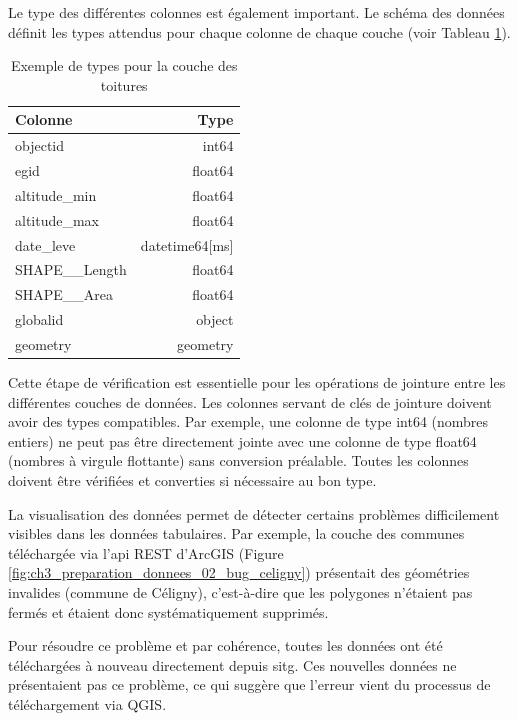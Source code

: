 Le type des différentes colonnes est également important. Le schéma des données définit les types attendus pour chaque colonne de chaque couche (voir Tableau \ref{tab:exemple_types_couche_toitures}).

\begin{table}[H]
    \centering
    \begin{tabular}{@{}lr@{}}
    \toprule
    \textbf{Colonne} & \textbf{Type} \\
    \midrule
    objectid & int64 \\
    egid & float64 \\
    altitude\_min & float64 \\
    altitude\_max & float64 \\
    date\_leve & datetime64[ms] \\
    SHAPE\_\_Length & float64 \\
    SHAPE\_\_Area & float64 \\
    globalid & object \\
    geometry & geometry \\
    \bottomrule
    \end{tabular}
    \caption{Exemple de types pour la couche des toitures}
    \label{tab:exemple_types_couche_toitures}
\end{table}

Cette étape de vérification est essentielle pour les opérations de jointure entre les différentes couches de données. Les colonnes servant de clés de jointure doivent avoir des types compatibles. Par exemple, une colonne de type int64 (nombres entiers) ne peut pas être directement jointe avec une colonne de type float64 (nombres à virgule flottante) sans conversion préalable. Toutes les colonnes doivent être vérifiées et converties si nécessaire au bon type.

\newpage
La visualisation des données permet de détecter certains problèmes difficilement visibles dans les données tabulaires. Par exemple, la couche des communes téléchargée via l'\acrshort{api} REST d'ArcGIS (Figure \ref{fig:ch3_preparation_donnees_02_bug_celigny}) présentait des géométries invalides (commune de Céligny), c'est-à-dire que les polygones n'étaient pas fermés et étaient donc systématiquement supprimés.

Pour résoudre ce problème et par cohérence, toutes les données ont été téléchargées à nouveau directement depuis \acrshort{sitg}. Ces nouvelles données ne présentaient pas ce problème, ce qui suggère que l'erreur vient du processus de téléchargement via QGIS.

